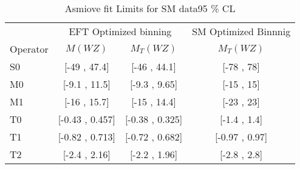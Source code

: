 \documentclass[../Bachelorarbeit.tex]{subfiles}
\begin{document}
\label{sec:SM_Limits}

\begin{table}
    \centering
    \begin{tabular}{l | c c | c }
        \hline
         & \multicolumn{2}{c|}{EFT Optimized binning} & SM Optimized Binnnig\\
        Operator & $M(WZ)$ & $M_{T}(WZ)$ &  $M_{T}(WZ)$ \\ 
        \hline
        S0 & [-49 , 47.4] & [-46 , 44.1] & [-78 , 78] \\
        M0 & [-9.1 , 11.5] & [-9.3 , 9.65] & [-15 , 15]\\
        M1 & [-16 , 15.7] & [-15 , 14.4] & [-23 , 23]\\
        T0 & [-0.43 , 0.457] & [-0.38 , 0.325] & [-1.4 , 1.4]\\
        T1 & [-0.82 , 0.713] & [-0.72 , 0.682] & [-0.97 , 0.97]\\
        T2 & [-2.4 , 2.16] & [-2.2 , 1.96] & [-2.8 , 2.8]\\
        \hline
    \end{tabular}
    \caption{Asmiove fit Limits for SM data95 \% CL }
    \label{tab:asimov}
\end{table}
\end{document}
